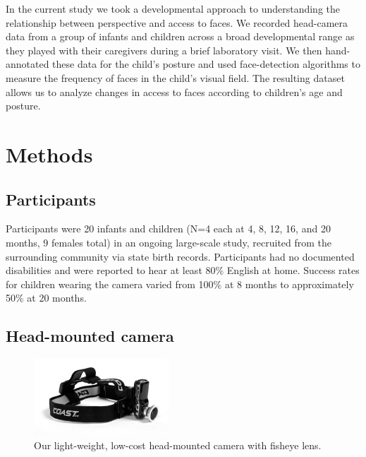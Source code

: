 \documentclass[10pt,letterpaper]{article}
\begin{document}
In the current study we took a developmental approach to understanding the relationship between perspective and access to faces. We recorded head-camera data from a group of infants and children across a broad developmental range as they played with their caregivers during a brief laboratory visit. We then hand-annotated these data for the child's posture and used face-detection algorithms to measure the frequency of faces in the child's visual field.  The resulting dataset allows us to analyze changes in access to faces according to children's age and posture. 

\section{Methods}

\subsection{Participants}

Participants were 20 infants and children (N=4 each at 4, 8, 12, 16, and 20 months, 9 females total) in an ongoing large-scale study, recruited from the surrounding community via state birth records. Participants had no documented disabilities and were reported to hear at least 80\% English at home. Success rates for children wearing the camera varied from 100\% at 8 months to approximately 50\% at 20 months. 


\subsection{Head-mounted camera}

\begin{figure}
\centering
\includegraphics[width=2in]{figures/headcam_w_fisheye3.jpg}
\caption{\label{fig:headcam} Our light-weight, low-cost head-mounted camera with fisheye lens.} 
\end{figure}
\end{document}
